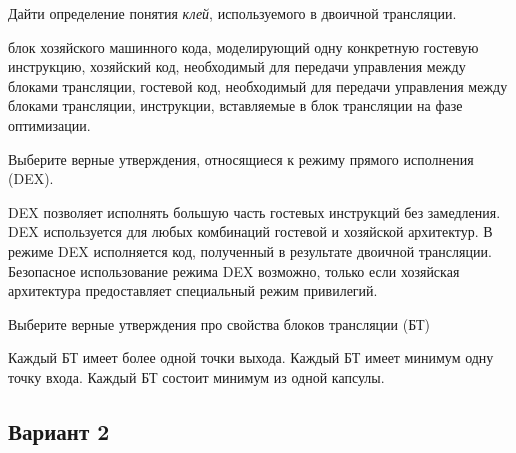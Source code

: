 \begin{questions}
\question[3] Дайти определение понятия \emph{клей}, используемого в двоичной трансляции.
\begin{choices}
    \choice блок хозяйского машинного кода, моделирующий одну конкретную гостевую инструкцию,
    \correctchoice хозяйский код, необходимый для передачи управления между блоками трансляции,
    \choice гостевой код, необходимый для передачи управления между блоками трансляции,
    \choice инструкции, вставляемые в блок трансляции на фазе оптимизации.
\end{choices}

\question[3] Выберите верные утверждения, относящиеся к режиму прямого исполнения (DEX).
\begin{choices}
\correctchoice DEX позволяет исполнять большую часть гостевых инструкций без замедления.
\choice DEX используется для любых комбинаций гостевой и хозяйской архитектур.
\choice В режиме DEX исполняется код, полученный в результате двоичной трансляции.
\correctchoice Безопасное использование режима DEX возможно, только если хозяйская архитектура предоставляет специальный режим привилегий.
\end{choices}

\question[3] Выберите верные утверждения про свойства блоков трансляции (БТ)
\begin{choices}
    \choice Каждый БТ имеет более одной точки выхода.
    \correctchoice Каждый БТ имеет минимум одну точку входа.
    \correctchoice Каждый БТ состоит минимум из одной капсулы.
\end{choices}

\end{questions}

\subsection*{Вариант 2}

